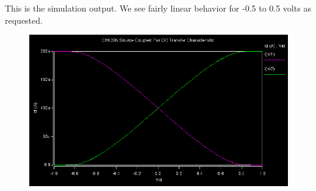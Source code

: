\documentclass[12pt]{article}
\begin{document}
This is the simulation output. We see fairly linear behavior for -0.5 to 0.5 volts as requested.
\FloatBarrier
\begin{figure}[h!]
\begin{center}
 \includegraphics[scale=0.5]{./comsrc.png}
\end{center}
\end{figure}
\end{document}
